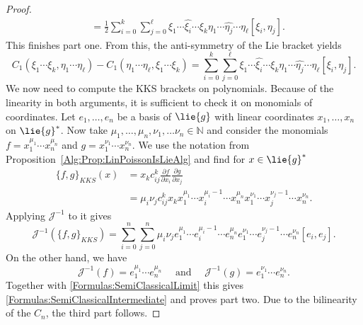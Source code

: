 \begin{proof}
\begin{align*}
		& =
		\frac{1}{2}
		\sum\limits_{i = 0}^k
		\sum\limits_{j = 0}^{\ell}
		\xi_1 \cdots \widehat{\xi_i} \cdots \xi_k
		\eta_1 \cdots \widehat{\eta_j} \cdots \eta_{\ell}
		[\xi_i, \eta_j].
	\end{align*}
	This finishes part one. From this, the anti-symmetry of the Lie bracket 
	yields
	\begin{equation*}
		C_1 
		\left(
			\xi_1 \cdots \xi_k, \eta_1 \cdots \eta_{\ell}
		\right)
		-
		C_1 
		\left(
			\eta_1 \cdots \eta_{\ell}, \xi_1 \cdots \xi_k
		\right)
		=
		\sum\limits_{i = 0}^k
		\sum\limits_{j = 0}^{\ell}
		\xi_1 \cdots \widehat{\xi_i} \cdots \xi_k
		\eta_1 \cdots \widehat{\eta_j} \cdots \eta_{\ell}
		[\xi_i, \eta_j].
	\end{equation*}
	We now need to compute the KKS brackets on polynomials. Because of the 
	linearity in both arguments, it is sufficient to check it on monomials of 
	coordinates. Let $e_1, \ldots, e_n$ be a basis of $\lie{g}$ with linear 
	coordinates 	$x_1, \ldots, x_n$ on $\lie{g}^*$. Now take $\mu_1, \ldots, 
	\mu_n, \nu_1, \ldots \nu_n \in \mathbb{N}$ and consider the monomials 
	$f = x_1^{\mu_1} \cdots x_n^{\mu_n}$ and $g = x_1^{\nu_1} \cdots 
	x_n^{\nu_n}$. We use the notation from 
	Proposition~\ref{Alg:Prop:LinPoissonIsLieAlg} and find for $x \in 
	\lie{g}^*$
	\begin{align*}
		\{ f, g \}_{KKS}(x)
		& =
		x_k c_{ij}^k
		\frac{\partial f}{\partial x_i}
		\frac{\partial g}{\partial x_j}
		\\
		& =
		\mu_i \nu_j c_{ij}^k
		x_k 
		x_1^{\mu_1} \cdots x_i^{\mu_i - 1} \cdots x_n^{\mu_n}
		x_1^{\nu_1} \cdots x_j^{\nu_j - 1} \cdots x_n^{\nu_n}.
	\end{align*}
	Applying $\mathcal{J}^{-1}$ to it gives
	\begin{equation}
		\label{Formulas:SemiClassicalIntermediate}
		\mathcal{J}^{-1}
		\left(
			\{ f, g \}_{KKS}
		\right)
		=
		\sum\limits_{i=0}^n
		\sum\limits_{j=0}^n
		\mu_i \nu_j
		e_1^{\mu_1} \cdots e_i^{\mu_i - 1} \cdots e_n^{\mu_n}
		e_1^{\nu_1} \cdots e_j^{\nu_j - 1} \cdots e_n^{\nu_n}
		[e_i, e_j].
	\end{equation}
	On the other hand, we have
	\begin{equation*}
		\mathcal{J}^{-1}(f)
		=
		e_1^{\mu_1} \cdots e_n^{\mu_n}
		\quad \text{ and } \quad
		\mathcal{J}^{-1}(g)
		=
		e_1^{\nu_1} \cdots e_n^{\nu_n}.
	\end{equation*}
	Together with \eqref{Formulas:SemiClassicalLimit} this gives
	\eqref{Formulas:SemiClassicalIntermediate} and proves part two.
	Due to the bilinearity of the $C_n$, the third part follows.
\end{proof}

